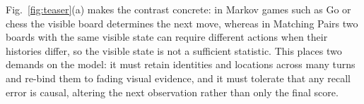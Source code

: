 \documentclass{llmxive}
\begin{document}

Fig.~\ref{fig:teaser}(a) makes the contrast concrete: in Markov games such as Go or chess the visible board determines the next move, whereas in Matching Pairs two boards with the same visible state can require different actions when their histories differ, so the visible state is not a sufficient statistic. This places two demands on the model: it must retain identities and locations across many turns and re-bind them to fading visual evidence, and it must tolerate that any recall error is causal, altering the next observation rather than only the final score.
\end{document}
